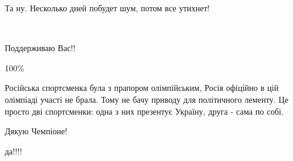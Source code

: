 \begin{itemize}
Та ну. Несколько дней побудет шум, потом все утихнет!

 
👍🏼👍🏼👍🏼👍🏼👍🏼

 
Поддерживаю Вас!!

 
100\%

 

Російська спортсменка була з прапором олімпійським, Росія офіційно в цій
олімпіаді участі не брала. Тому не бачу приводу для політичного лементу. Це
просто дві спортсменки: одна з них презентує Україну, друга - сама по собі.


 
Дякую Чемпіоне!

 

да!!!!

 


\end{itemize}
